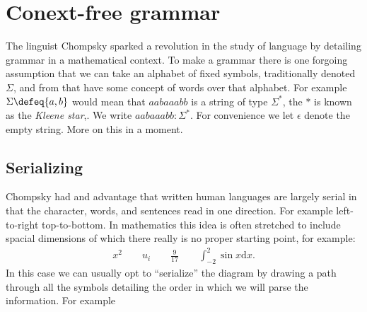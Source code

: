 \section{Conext-free grammar}

The linguist Chompsky sparked a revolution in the study of language by 
detailing grammar in a mathematical context.  To make a grammar
there is one forgoing assumption that we can take an alphabet of 
fixed symbols, traditionally denoted $\Sigma$, and from that 
have some concept of words over that alphabet.  For example 
$\Sigma\defeq\{a,b\}$ would mean that $aabaaabb$ is a string
of type $\Sigma^*$, the $*$ is known as the \emph{Kleene star},.  We write $aabaaabb:\Sigma^*$.  For convenience we 
let $\epsilon$ denote the empty string.  More on this in a moment.

\subsection{Serializing}
Chompsky had and advantage that written human languages are largely serial
in that the character, words, and sentences read in one direction.  For 
example left-to-right top-to-bottom.  In mathematics this idea is often stretched to include spacial dimensions of which there really is no 
proper starting point, for example:
\begin{align*}
    x^2 \qquad u_i \qquad \frac{9}{17}\qquad \int_{-2}^2 \sin x \text{d}x.
\end{align*}
In this case we can usually opt to ``serialize'' the diagram by drawing 
a path through all the symbols detailing the order in which we will parse 
the information.  For example
\begin{center}
\end{center}

